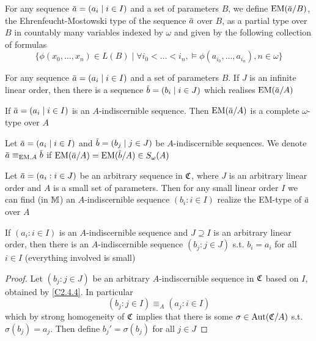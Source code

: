 \documentclass[11pt]{article}
\begin{document}
\begin{definition}[]
For any sequence \(\bara=(a_i\mid i\in I)\) and a set of parameters \(B\), we define \(\EM(\bara/B)\),
the Ehrenfeucht-Mostowski type of the sequence \(\bara\) over \(B\), as a partial type
over \(B\) in countably many variables indexed by \(\omega\) and given by the following collection of
formulas
\begin{equation*}
\{\phi(x_0,\dots,x_n)\in L(B)\mid\forall i_0<\dots<i_n,\vDash\phi(a_{i_0},\dots,a_{i_n}),n\in\omega\}
\end{equation*}
\end{definition}

\begin{exercise}
For any sequence \(\bara=(a_i\mid i\in I)\) and a set of parameters \(B\). If \(J\) is an infinite
linear order, then there is a sequence \(\barb=(b_i\mid i\in J)\) which realises \(\EM(\bara/A)\)
\end{exercise}

\begin{exercise}
If \(\bara=(a_i\mid i\in I)\) is an \(A\)-indiscernible sequence. Then \(\EM(\bara/A)\) is a complete
\(\omega\)-type over \(A\)
\end{exercise}

Let \(\bara=(a_i\mid i\in I)\) and \(\barb=(b_j\mid j\in J)\) be \(A\)-indiscernible sequences. We
denote \(\bara\equiv_{\EM,A}\barb\) if \(\EM(\bara/A)=\EM(\barb/A)\in S_\omega(A)\)

\begin{proposition}[]
\label{C2.4.4}
Let \(\bara=(a_i:i\in J)\) be an arbitrary sequence in \(\mathfrak{C}\), where \(J\) is an arbitrary linear
order and \(A\) is a small set of parameters. Then for any small linear order \(I\) we can find (in \(\mathbb{M}\))
an \(A\)-indiscernible sequence \((b_i:i\in I)\) realize the EM-type of \(\bara\) over \(A\)
\end{proposition}

\begin{corollary}[]
If \((a_i:i\in I)\) is an \(A\)-indiscernible sequence and \(J\supseteq I\) is an arbitrary linear order,
then there is an \(A\)-indiscernible sequence \((b_j:j\in J)\) s.t. \(b_i=a_i\) for all \(i\in I\)
(everything involved is small)
\end{corollary}

\begin{proof}
Let \((b_j:j\in J)\) be an arbitrary \(A\)-indiscernible sequence in \(\mathfrak{C}\) based on \(I\),
obtained by \ref{C2.4.4}. In particular
\begin{equation*}
(b_j:j\in I)\equiv_A(a_j:i\in I)
\end{equation*}
which by strong homogeneity of \(\mathfrak{C}\) implies that there is some \(\sigma\in\operatorname{\text{Aut}}(\mathfrak{C}/A)\)
s.t. \(\sigma(b_j)=a_j\). Then define \(b_j'=\sigma(b_j)\) for all \(j\in J\)
\end{proof}
\end{document}

